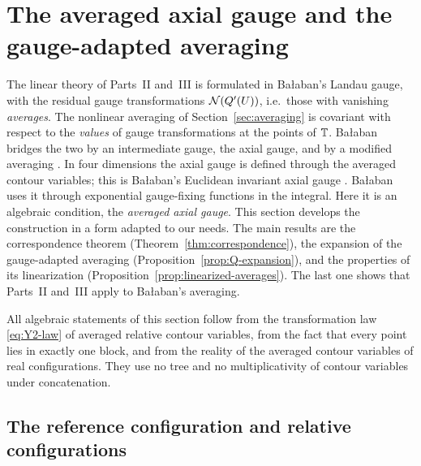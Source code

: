 \section{The averaged axial gauge and the gauge-adapted averaging}\label{sec:adapted}

The linear theory of Parts~II and~III is formulated in Ba\l aban's Landau gauge, with the residual gauge transformations $\mathcal N(Q'(U))$, i.e.\ those with vanishing \emph{averages}. The nonlinear averaging of Section~\ref{sec:averaging} is covariant with respect to the \emph{values} of gauge transformations at the points of $\mathbb T$. Ba\l aban bridges the two by an intermediate gauge, the axial gauge, and by a modified averaging \cite[Sect.~C]{BalAvg}. In four dimensions the axial gauge is defined through the averaged contour variables; this is Ba\l aban's Euclidean invariant axial gauge \cite[pp.~253--254]{BalYM4I}. Ba\l aban uses it through exponential gauge-fixing functions in the integral. Here it is an algebraic condition, the \emph{averaged axial gauge}. This section develops the construction in a form adapted to our needs. The main results are the correspondence theorem (Theorem~\ref{thm:correspondence}), the expansion of the gauge-adapted averaging (Proposition~\ref{prop:Q-expansion}), and the properties of its linearization (Proposition~\ref{prop:linearized-averages}). The last one shows that Parts~II and~III apply to Ba\l aban's averaging.

All algebraic statements of this section follow from the transformation law \eqref{eq:Y2-law} of averaged relative contour variables, from the fact that every point lies in exactly one block, and from the reality of the averaged contour variables of real configurations. They use no tree and no multiplicativity of contour variables under concatenation.

\subsection{The reference configuration and relative configurations}\label{ss:22.1}

